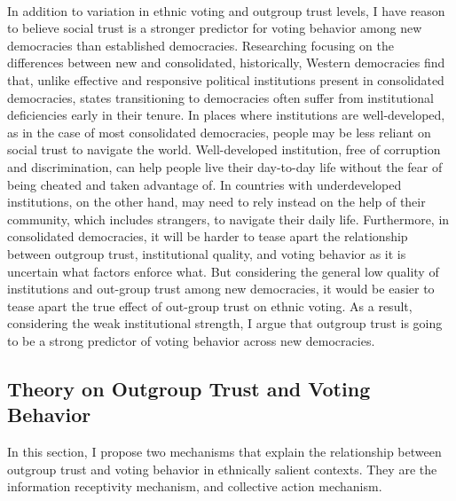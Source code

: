 \documentclass[a4paper, 12pt]{article}
\begin{document}
\paragraph{}
In addition to variation in ethnic voting and outgroup trust levels, I have reason to believe social trust is a stronger predictor for voting behavior among new democracies than established democracies. Researching focusing on the differences between new and consolidated, historically, Western democracies find that, unlike effective and responsive political institutions present in consolidated democracies, states transitioning to democracies often suffer from institutional deficiencies early in their tenure\cite{huntingtonHowCountriesDemocratize1991, sorensenDemocracyDemocratizationProcesses2008}. In places where institutions are well-developed, as in the case of most consolidated democracies, people may be less reliant on social trust to navigate the world. Well-developed institution, free of corruption and discrimination, can help people live their day-to-day life without the fear of being cheated and taken advantage of. In countries with underdeveloped institutions, on the other hand, may need to rely instead on the help of their community, which includes strangers, to navigate their daily life. Furthermore, in consolidated democracies, it will be harder to tease apart the relationship between outgroup trust, institutional quality, and voting behavior as it is uncertain what factors enforce what. But considering the general low quality of institutions and out-group trust  among new democracies, it would be easier to tease apart the true effect of out-group trust on ethnic voting. As a result, considering the weak institutional strength, I argue that outgroup trust is going to be a strong predictor of voting behavior across new democracies.  

\subsection{Theory on Outgroup Trust and Voting Behavior}
In this section, I propose two mechanisms that explain the relationship between outgroup trust and voting behavior in ethnically salient contexts. They are the information receptivity mechanism, and collective action mechanism. 
\end{document}
